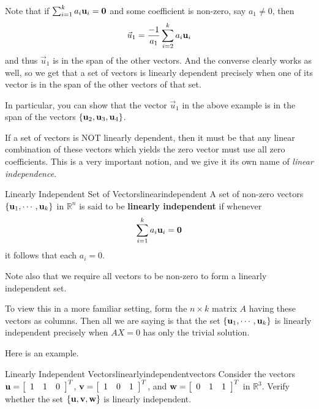 Note that if $\sum_{i=1}^{k}a_{i}{\bf u}_{i}={\bf 0}$ and some
coefficient is non-zero, say $a_1 \neq 0$, then 
\begin{equation*}
\vec{u}_1 = \frac{-1}{a_1} \sum_{i=2}^{k}a_{i}{\bf u}_{i} 
\end{equation*}
and thus $\vec{u}_1$ is in the span of the other vectors. And the converse clearly works as well,
so we get that a set of vectors is linearly dependent precisely when
one of its vector is in the span of the other vectors of that set.

In particular, you can show that the vector $\vec{u}_1$ in the above
example is in the span of the vectors  $\{ {\bf u}_2, {\bf u}_3, {\bf u}_4 \}$. 

If a set of vectors is NOT linearly dependent, then it must be that
any linear combination of these vectors which yields the zero vector
must use all zero coefficients. This is a very important notion, and we give it its own name of {\em
linear independence}. 

\begin{definition}{Linearly Independent Set of Vectors}{linearindependent}
A set of non-zero vectors $\{ {\bf u}_1, \cdots ,{\bf u}_k\}$ in $\mathbb{R}^{n}$ is said to be 
\textbf{linearly independent} if whenever 
\begin{equation*}
\sum_{i=1}^{k}a_{i}{\bf u}_{i}={\bf 0}
\end{equation*}
it follows that each $a_{i}=0$.
\end{definition}


Note also that we require all vectors to be non-zero to form a
linearly independent set.

To view this in a more familiar setting, form the $n \times k$ matrix
$A$ having these vectors as columns. Then all we are saying is that
the set $\{ {\bf u}_1, \cdots ,{\bf u}_k\}$ is linearly independent
precisely when $AX=0$ has only the trivial solution.

Here is an example.  

\begin{example}{Linearly Independent Vectors}{linearlyindependentvectors}
Consider the vectors ${\bf u}=\left[ 
\begin{array}{rrr}
1  & 1 & 0
\end{array}
\right]^T$, 
${\bf v}=\left[ 
\begin{array}{rrr}
1  & 0 & 1
\end{array}
\right]^T$, and
${\bf w}=\left[ 
\begin{array}{rrr}
0  & 1 & 1
\end{array}
\right]^T$ in $\mathbb{R}^{3}$.
Verify whether the set $\{{\bf u}, {\bf v}, {\bf w}\}$ is linearly independent. 
\end{example}


